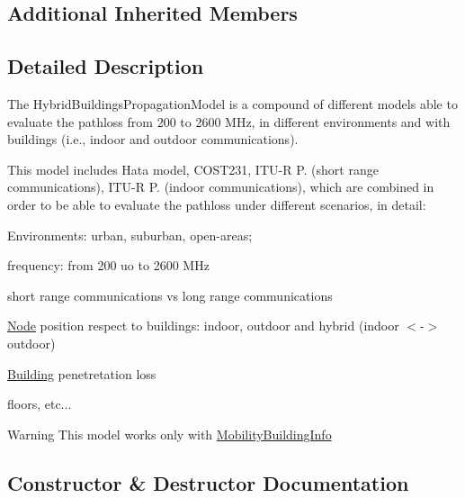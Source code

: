 \subsection*{Additional Inherited Members}


\subsection{Detailed Description}
The Hybrid\+Buildings\+Propagation\+Model is a compound of different models able to evaluate the pathloss from 200 to 2600 M\+Hz, in different environments and with buildings (i.\+e., indoor and outdoor communications). 

This model includes Hata model, C\+O\+S\+T231, I\+T\+U-\/R P. (short range communications), I\+T\+U-\/R P. (indoor communications), which are combined in order to be able to evaluate the pathloss under different scenarios, in detail\+:
\begin{DoxyItemize}
\item Environments\+: urban, suburban, open-\/areas;
\item frequency\+: from 200 uo to 2600 M\+Hz
\item short range communications vs long range communications
\item \hyperlink{classns3_1_1Node}{Node} position respect to buildings\+: indoor, outdoor and hybrid (indoor $<$-\/$>$ outdoor)
\item \hyperlink{classns3_1_1Building}{Building} penetretation loss
\item floors, etc...
\end{DoxyItemize}

\begin{DoxyWarning}{Warning}
This model works only with \hyperlink{classns3_1_1MobilityBuildingInfo}{Mobility\+Building\+Info} 
\end{DoxyWarning}


\subsection{Constructor \& Destructor Documentation}
